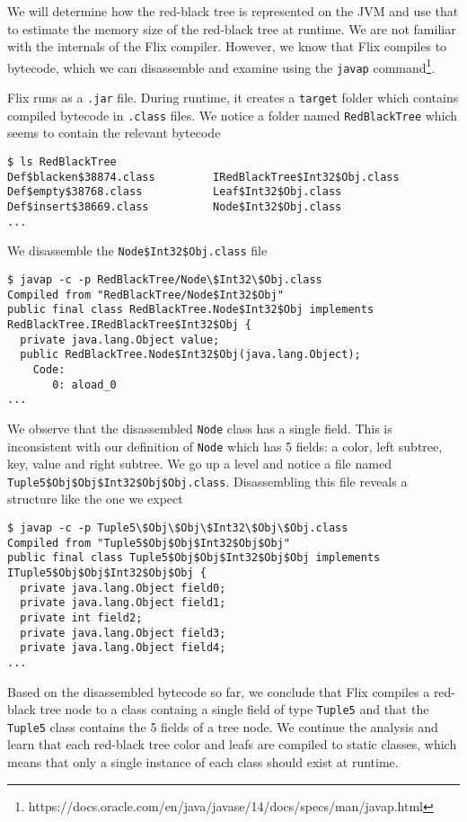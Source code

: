 \documentclass[../main.tex]{subfiles}
\begin{document}
We will determine how the red-black tree is represented on the JVM and use that to estimate the memory size of the red-black tree at runtime. We are not familiar with the internals of the Flix compiler. However, we know that Flix compiles to bytecode, which we can disassemble and examine using the \lstinline{javap} command\footnote{https://docs.oracle.com/en/java/javase/14/docs/specs/man/javap.html}.

Flix runs as a \lstinline{.jar} file. During runtime, it creates a \lstinline{target} folder which contains compiled bytecode in \lstinline{.class} files. We notice a folder named \lstinline{RedBlackTree} which seems to contain the relevant bytecode
\begin{lstlisting}
$ ls RedBlackTree
Def$blacken$38874.class			IRedBlackTree$Int32$Obj.class
Def$empty$38768.class			Leaf$Int32$Obj.class
Def$insert$38669.class			Node$Int32$Obj.class
...
\end{lstlisting}
We disassemble the \lstinline{Node$Int32$Obj.class} file
\begin{lstlisting}
$ javap -c -p RedBlackTree/Node\$Int32\$Obj.class
Compiled from "RedBlackTree/Node$Int32$Obj"
public final class RedBlackTree.Node$Int32$Obj implements RedBlackTree.IRedBlackTree$Int32$Obj {
  private java.lang.Object value;
  public RedBlackTree.Node$Int32$Obj(java.lang.Object);
    Code:
       0: aload_0
...
\end{lstlisting}
We observe that the disassembled \lstinline{Node} class has a single field. This is inconsistent with our definition of \lstinline{Node} which has 5 fields: a color, left subtree, key, value and right subtree. We go up a level and notice a file named \lstinline{Tuple5$Obj$Obj$Int32$Obj$Obj.class}. Disassembling this file reveals a structure like the one we expect
\begin{lstlisting}
$ javap -c -p Tuple5\$Obj\$Obj\$Int32\$Obj\$Obj.class 
Compiled from "Tuple5$Obj$Obj$Int32$Obj$Obj"
public final class Tuple5$Obj$Obj$Int32$Obj$Obj implements ITuple5$Obj$Obj$Int32$Obj$Obj {
  private java.lang.Object field0;
  private java.lang.Object field1;
  private int field2;
  private java.lang.Object field3;
  private java.lang.Object field4;
...
\end{lstlisting}
Based on the disassembled bytecode so far, we conclude that Flix compiles a red-black tree node to a class containg a single field of type \lstinline{Tuple5} and that the \lstinline{Tuple5} class contains the 5 fields of a tree node. We continue the analysis and learn that each red-black tree color and leafs are compiled to static classes, which means that only a single instance of each class should exist at runtime.
\end{document}
